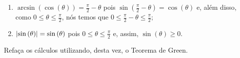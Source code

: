 \begin{enumerate}
  \item
    \(\arcsin{(\cos{(\theta)})}=\frac{\pi}{2}-\theta\) pois
    \(\sin{(\frac{\pi}{2}-\theta)}=\cos{(\theta)}\) e, além disso, como
    \(0\leqslant{\theta}\leqslant{\frac{\pi}{2}}\), nós temos que
    \(0\leqslant{\frac{\pi}{2}-\theta}\leqslant{\frac{\pi}{2}}\);
  \item
    \(\lvert\sin{(\theta)}\rvert=\sin{(\theta)}\) pois
    \(0\leqslant{\theta}\leqslant{\frac{\pi}{2}}\) e, assim,
    \(\sin{(\theta)}\geqslant{0}\).
\end{enumerate}

\begin{remark}
  Refaça os cálculos utilizando, desta vez, o Teorema de Green.
\end{remark}
